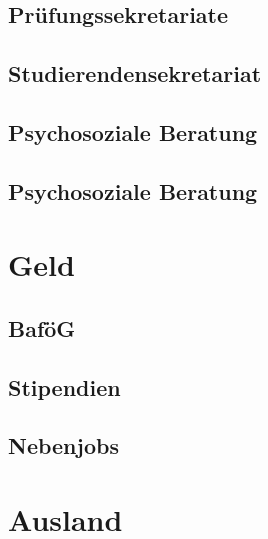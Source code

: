 \documentclass[12pt, a4paper]{article}
\newif\ifinfo
\begin{document}
	\subsection{Prüfungssekretariate}
	

	\subsection{Studierendensekretariat}
	

	\subsection{Psychosoziale Beratung}
	
\else
	\subsection{Psychosoziale Beratung}
	
\fi

\newpage
\section{Geld}

\subsection{BaföG}


\subsection{Stipendien}


\subsection{Nebenjobs}


\ifinfo
	\newpage
\fi

\section{Ausland}


\newpage
%
\end{document}
